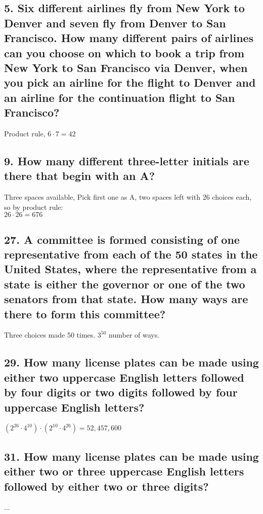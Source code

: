 \documentclass[11pt, oneside]{article} %
\numberwithin{equation}{section} %
\numberwithin{figure}{section} %
\numberwithin{table}{section} %
\begin{document}
\subsection{5. Six different airlines fly from New York to Denver and seven fly from Denver to San Francisco. How many different pairs of airlines can you choose on which to book a trip from New York to San Francisco via Denver, when you pick an airline for the flight to Denver and an airline for the continuation flight to San Francisco?}
Product rule, $6 \cdot 7 = 42$

\subsection{9. How many different three-letter initials are there that begin with an A?}
Three spaces available, Pick first one as A, two spaces left with 26 choices each, so by product rule:\\
$26 \cdot 26 = 676$

\subsection{27. A committee is formed consisting of one representative from each of the 50 states in the United States, where the representative from a state is either the governor or one of the two senators from that state. How many ways are there to form this committee?}
Three choices made 50 times. $3^{50}$ number of ways. 
 

\subsection{29. How many license plates can be made using either two uppercase English letters followed by four digits or two digits followed by four uppercase English letters?}
$(2^{26} \cdot 4^{10})\cdot (2^{10}\cdot 4^{26}) = 52,457,600$


\subsection{31. How many license plates can be made using either two or three uppercase English letters followed by either two or three digits?}
...
 
\end{document}
